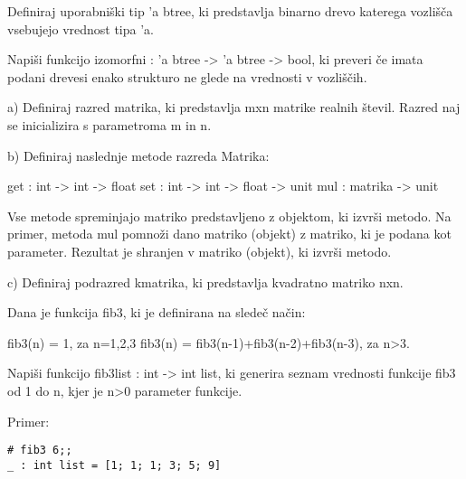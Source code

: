 \begin{ex}
  Definiraj uporabni\v ski tip 'a btree, ki predstavlja binarno drevo
  katerega vozli\v s\v ca vsebujejo vrednost tipa 'a.

  Napi\v si funkcijo izomorfni : 'a btree -> 'a btree -> bool, ki
  preveri \v ce imata podani drevesi enako strukturo ne glede na
  vrednosti v vozli\v s\v cih.


\end{ex} 
\begin{ex}
  a) Definiraj razred matrika, ki predstavlja mxn matrike realnih \v
  stevil. Razred naj se inicializira s parametroma m in n.

  b) Definiraj naslednje metode razreda Matrika:

  get : int -> int -> float
  set : int -> int -> float -> unit
  mul : matrika -> unit

  Vse metode spreminjajo matriko predstavljeno z objektom, ki izvr\v
  si metodo.  Na primer, metoda mul pomno\v zi dano matriko (objekt) z
  matriko, ki je podana kot parameter. Rezultat je shranjen v matriko
  (objekt), ki izvr\v si metodo.

  c) Definiraj podrazred kmatrika, ki predstavlja kvadratno matriko
  nxn.


\end{ex} 
\begin{ex}
  Dana je funkcija fib3, ki je definirana na slede\v c na\v cin:

  fib3(n) = 1, za n=1,2,3
  fib3(n) = fib3(n-1)+fib3(n-2)+fib3(n-3), za n>3.

  Napi\v si funkcijo fib3list : int -> int list, ki generira seznam
  vrednosti funkcije fib3 od 1 do n, kjer je n>0 parameter funkcije.

\noindent\/Primer:
\begin{verbatim}
# fib3 6;;
_ : int list = [1; 1; 1; 3; 5; 9]
\end{verbatim}

%
%
%

\end{ex} 
